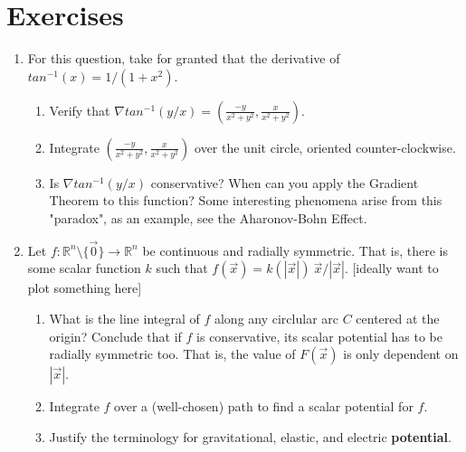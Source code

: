 \documentclass[11pt,openany]{book}
\newcommand*{\exercises}{\section*{\exercisename}}
\newcommand{\exercisename}{Exercises}
\begin{document}
	\exercises
	\begin{enumerate}
		
		\item For this question, take for granted that the derivative of $tan^{-1}(x) = 1/(1+x^2)$. \begin{enumerate}
			\item Verify that $\nabla tan^{-1}(y/x) = (\frac{-y}{x^2+y^2}, \frac{x}{x^2+y^2})$.
			\item Integrate $(\frac{-y}{x^2+y^2}, \frac{x}{x^2+y^2})$ over the unit circle, oriented counter-clockwise.
			\item Is $\nabla tan^{-1}(y/x)$ conservative? When can you apply the Gradient Theorem to this function? Some interesting phenomena arise from this "paradox", as an example, see the Aharonov-Bohn Effect.
		\end{enumerate}
		\item Let $f:\mathbb{R}^n\setminus\{\vec{0}\} \to\mathbb{R}^n$ be continuous and radially symmetric. That is, there is some scalar function $k$ such that $f(\vec{x})= k(|\vec{x}|) \ \vec{x}/ |\vec{x}|$. [ideally want to plot something here] \begin{enumerate}
			\item What is the line integral of $f$ along any circlular arc $C$ centered at the origin? Conclude that if $f$ is conservative, its scalar potential has to be radially symmetric too. 
			That is, the value of $F(\vec{x})$ is only dependent on $|\vec{x}|$.
			\item Integrate $f$ over a (well-chosen) path to find a scalar potential for $f$.
			\item Justify the terminology for gravitational, elastic, and electric \textbf{potential}.  
		\end{enumerate}
		
	\end{enumerate}
	
\end{document}
